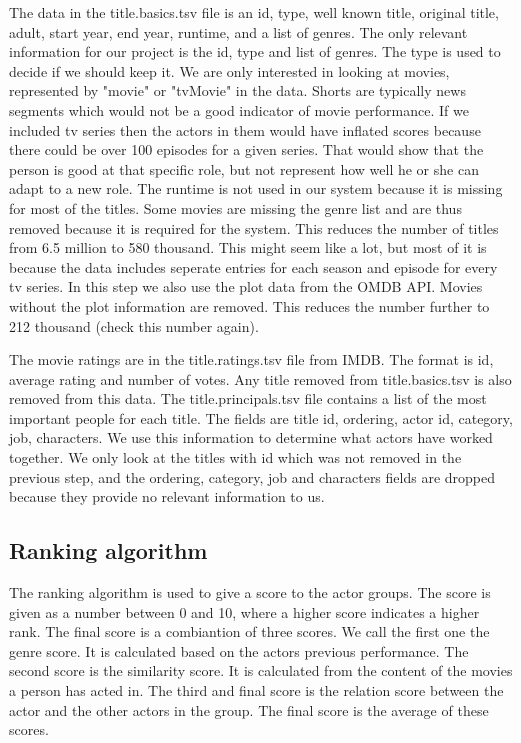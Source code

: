 The data in the title.basics.tsv file is an id,	type, well known title,	original title,	adult, start year, end year, runtime, and a list of genres. The only relevant information for our project is the id, type and list of genres. The type is used to decide if we should keep it. We are only interested in looking at movies, represented by "movie" or "tvMovie" in the data. Shorts are typically news segments which would not be a good indicator of movie performance. If we included tv series then the actors in them would have inflated scores because there could be over 100 episodes for a given series. That would show that the person is good at that specific role, but not represent how well he or she can adapt to a new role. The runtime is not used in our system because it is missing for most of the titles. Some movies are missing the genre list and are thus removed because it is required for the system. This reduces the number of titles from 6.5 million to 580 thousand. This might seem like a lot, but most of it is because the data includes seperate entries for each season and episode for every tv series. In this step we also use the plot data from the OMDB API. Movies without the plot information are removed. This reduces the number further to 212 thousand (check this number again).

The movie ratings are in the title.ratings.tsv file from IMDB. The format is id, average rating and number of votes. Any title removed from title.basics.tsv is also removed from this data. The title.principals.tsv file contains a list of the most important people for each title. The fields are title id, ordering, actor id, category, job, characters. We use this information to determine what actors have worked together. We only look at the titles with id which was not removed in the previous step, and the ordering, category, job and characters fields are dropped because they provide no relevant information to us.

\subsection{Ranking algorithm}
The ranking algorithm is used to give a score to the actor groups. The score is given as a number between 0 and 10, where a higher score indicates a higher rank. The final score is a combiantion of three scores. We call the first one the genre score. It is calculated based on the actors previous performance. The second score is the similarity score. It is calculated from the content of the movies a person has acted in. The third and final score is the relation score between the actor and the other actors in the group. The final score is the average of these scores.

